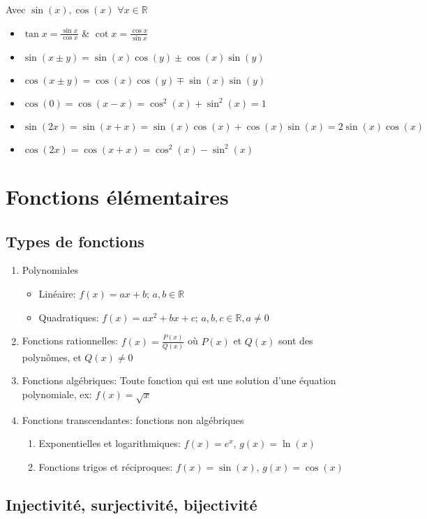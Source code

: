 \documentclass[10pt,a4paper]{book}
\newcommand{\R}{\mathbb{R}}
\begin{document}
Avec $\sin(x), \cos(x)$  $\forall x \in \R$
\begin{itemize}
\item $\tan x = \frac{\sin x}{\cos x}$ \& $\cot x = \frac{\cos x}{\sin x}$
\item $\sin(x\pm y) = \sin(x)\cos(y) \pm \cos(x)\sin(y)$
\item $\cos(x \pm y) = \cos(x)\cos(y) \mp \sin(x)\sin(y)$
\item $\cos(0) = \cos(x-x) = \cos^2(x) + \sin^2(x) = 1$
\item $\sin(2x) = \sin(x+x) = \sin(x)\cos(x) + \cos(x)\sin(x) = 2\sin(x)\cos(x)$
\item $\cos(2x) = \cos(x+x) = \cos^2(x) - \sin^2(x)$
\end{itemize}

\section{Fonctions élémentaires}

\subsection{Types de fonctions}
\begin{enumerate}
\item Polynomiales
\begin{itemize}
\item Linéaire: $f(x) = ax + b$; $a,b \in \R$
\item Quadratiques: $f(x) = ax^2 + bx + c$; $a,b,c \in \R, a \neq 0$
\end{itemize}
\item Fonctions rationnelles: $f(x) = \frac{P(x)}{Q(x)}$ où $P(x)$ et $Q(x)$ sont des polynômes, et $Q(x) \neq 0$
\item Fonctions algébriques: Toute fonction qui est une solution d'une équation polynomiale, ex: $f(x) = \sqrt{x}$
\item Fonctions transcendantes: fonctions non algébriques
\begin{enumerate}
\item Exponentielles et logarithmiques: $f(x) = e^x$, $g(x) = \ln(x)$
\item Fonctions trigos et réciproques: $f(x) = \sin(x)$, $g(x) = \cos(x)$ 
\end{enumerate}
\end{enumerate}

\subsection{Injectivité, surjectivité, bijectivité}
\end{document}
